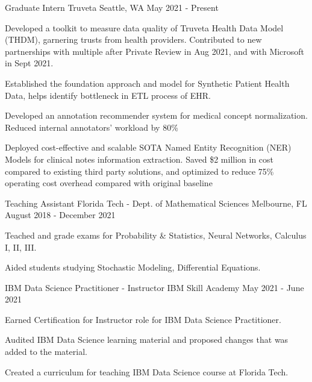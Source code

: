 \begin{cventries}

	\cventry
	{Graduate Intern}
	{Truveta}
	{Seattle, WA}
	{May 2021 - Present}
	{\begin{cvitems}
			\item {Developed a toolkit to measure data quality of Truveta Health Data Model (THDM), garnering trusts from health providers. Contributed to new partnerships with multiple after Private Review in Aug 2021, and with Microsoft in Sept 2021.}
			\item {Established the foundation approach and model for Synthetic Patient Health Data, helps identify bottleneck in ETL process of EHR.}
			\item {Developed an annotation recommender system for medical concept normalization. Reduced internal annotators' workload by 80\%}
			\item {Deployed cost-effective and scalable SOTA Named Entity Recognition (NER) Models for clinical notes information extraction. Saved \$2 million in cost compared to existing third party solutions, and optimized to reduce 75\% operating cost overhead compared with original baseline}
		\end{cvitems}}
	\cventry
	{Teaching Assistant}
	{Florida Tech - Dept. of Mathematical Sciences}
	{Melbourne, FL}
	{August 2018 - December 2021}
	{\begin{cvitems}
			\item {Teached and grade exams for Probability \& Statistics, Neural Networks, Calculus I, II, III.}
			\item {Aided students studying Stochastic Modeling, Differential Equations.}
		\end{cvitems}}
	\cventry
	{IBM Data Science Practitioner - Instructor}
	{IBM Skill Academy}
	{}
	{May 2021 - June 2021}
	{\begin{cvitems}
			\item {Earned Certification for Instructor role for IBM Data Science Practitioner.}
			\item {Audited IBM Data Science learning material and proposed changes that was added to the material.}
			\item {Created a curriculum for teaching IBM Data Science course at Florida Tech.}
		\end{cvitems}}
\end{cventries}
\vspace{-4mm}